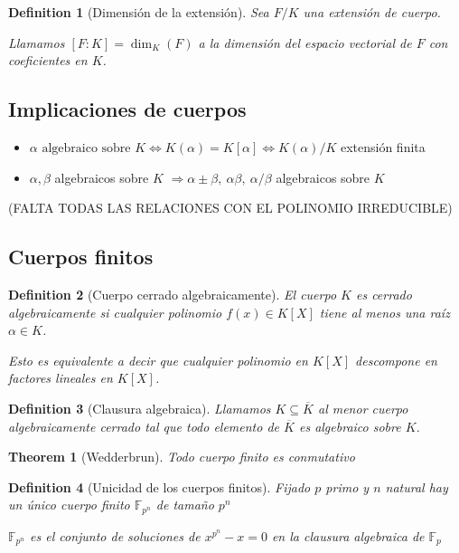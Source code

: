 \documentclass[leqno]{article}
\newtheorem*{theorem}{Theorem}
\newtheorem*{definition}{Definition}
\begin{document}
\begin{definition}[Dimensión de la extensión]
Sea $F / K$ una extensión de cuerpo. 

Llamamos $[F:K] = \dim_{K}(F)$ a la dimensión del espacio vectorial de $F$ con coeficientes en $K$.
\end{definition}

\subsection{Implicaciones de cuerpos}
\begin{itemize}[topsep=-6pt, itemsep=0pt]
  \item $\alpha \text{ algebraico sobre }K \iff K(\alpha ) = K[\alpha ] \iff K(\alpha ) / K$ extensión finita
  \item $\alpha , \beta $ algebraicos sobre $K$ $\Rightarrow \alpha \pm \beta , \ \alpha \beta , \ \alpha / \beta $ algebraicos sobre $K$
\end{itemize}

(FALTA TODAS LAS RELACIONES CON EL POLINOMIO IRREDUCIBLE)

\subsection{Cuerpos finitos}

\begin{definition}[Cuerpo cerrado algebraicamente] El cuerpo $K$ es cerrado algebraicamente si cualquier polinomio $f(x)\in K[X]$ tiene al menos una raíz $\alpha \in K$.

  Esto es equivalente a decir que cualquier polinomio en $K[X]$ descompone en factores lineales en $K[X]$.
\end{definition}

\begin{definition}[Clausura algebraica] Llamamos  $K\subseteq \overline{K}$ al menor cuerpo algebraicamente cerrado tal que todo elemento de $\overline{K}$ es algebraico sobre $K$.
\end{definition}

\begin{theorem}[Wedderbrun]
Todo cuerpo finito es conmutativo
\end{theorem}

\begin{definition}[Unicidad de los cuerpos finitos] Fijado $p$ primo y $n$ natural hay un único cuerpo finito $\mathbb{F}_{p^n}$ de tamaño  $p^n$  

$\mathbb{F}_{p^n}$ es el conjunto de soluciones de $x^{p^n}-x=0$ en la clausura algebraica de $\mathbb{F}_{p}$
\end{definition}
\end{document}
